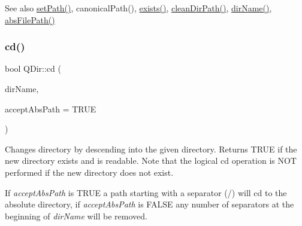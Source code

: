 \begin{DoxySeeAlso}{See also}
\mbox{\hyperlink{class_q_dir_ac947989c99aecbfebd509088b8834715}{set\+Path()}}, canonical\+Path(), \mbox{\hyperlink{class_q_dir_a97e8132d482e374745230de942def208}{exists()}}, \mbox{\hyperlink{class_q_dir_ad38037708dc754f5bdd877c145dbbb19}{clean\+Dir\+Path()}}, \mbox{\hyperlink{class_q_dir_a2c904d64a7194a57ee583d111cbbdeff}{dir\+Name()}}, \mbox{\hyperlink{class_q_dir_aca84b0a728bc2b88c3ab55cbed6e18c4}{abs\+File\+Path()}} 
\end{DoxySeeAlso}
\mbox{\label{class_q_dir_a5a58d7a5387627fa479f2ac376895e6a}} 
\subsubsection{\texorpdfstring{cd()}{cd()}}
{\footnotesize\ttfamily bool Q\+Dir\+::cd (\begin{DoxyParamCaption}\item[{const \mbox{\hyperlink{class_q_string}{Q\+String}} \&}]{dir\+Name,  }\item[{bool}]{accept\+Abs\+Path = {\ttfamily TRUE} }\end{DoxyParamCaption})\hspace{0.3cm}{\ttfamily [virtual]}}

Changes directory by descending into the given directory. Returns T\+R\+UE if the new directory exists and is readable. Note that the logical cd operation is N\+OT performed if the new directory does not exist.

If {\itshape accept\+Abs\+Path} is T\+R\+UE a path starting with a separator (\textquotesingle{}/\textquotesingle{}) will cd to the absolute directory, if {\itshape accept\+Abs\+Path} is F\+A\+L\+SE any number of separators at the beginning of {\itshape dir\+Name} will be removed.

